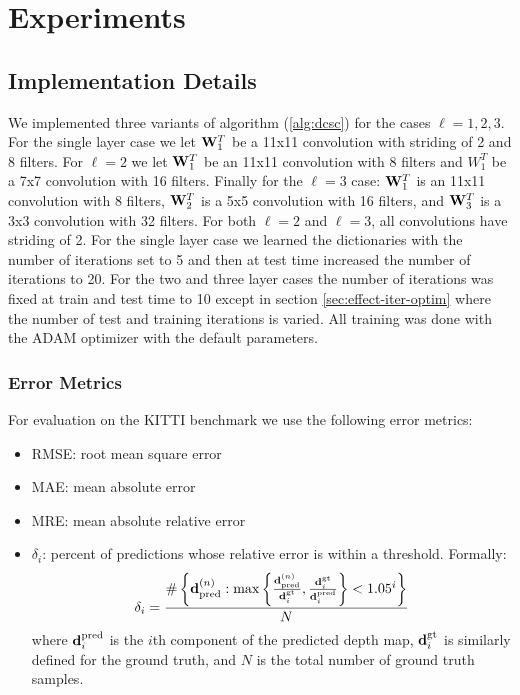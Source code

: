 \section{Experiments}

\subsection{Implementation Details}
\label{sec:impl-deta}

We implemented three variants of algorithm (\ref{alg:dcsc}) for the cases $\ell = 1,2,3$. For the single layer case we let $\mathbf{W}^T_1$ be a 11x11 convolution with striding of 2 and 8 filters. For $\ell = 2$ we let $\mathbf{W}^T_{1}$ be an 11x11 convolution with 8 filters and $W^T_{1}$ be a 7x7 convolution with 16 filters. Finally for the $\ell = 3$ case: $\mathbf{W}^T_{1}$ is an 11x11 convolution with 8 filters, $\mathbf{W}^T_{2}$ is a 5x5 convolution with 16 filters, and $\mathbf{W}^T_{3}$ is a 3x3 convolution with 32 filters. For both $\ell = 2$ and $\ell = 3$, all convolutions have striding of 2. For the single layer case we learned the dictionaries with the number of iterations set to 5 and then at test time increased the number of iterations to 20. For the two and three layer cases the number of iterations was fixed at train and test time to 10 except in section \ref{sec:effect-iter-optim} where the number of test and training iterations is varied. All training was done with the ADAM optimizer with the default parameters.

\subsubsection{Error Metrics}
\label{sec:error-metrics}

For evaluation on the KITTI benchmark we use the following error metrics:
\begin{itemize}
\item RMSE: root mean square error
\item MAE: mean absolute error
\item MRE: mean absolute relative error
\item $\delta_i$: percent of predictions whose relative error is within a threshold. Formally:
  \begin{equation*}
    \delta_i = \frac{\#\left\{\mathbf{d}^{(n)}_\text{pred} : \max\left\{\frac{\mathbf{d}^{(n)}_\text{pred}}{\mathbf{d}^\text{gt}_i}, \frac{\mathbf{d}^\text{gt}_i}{\mathbf{d}^\text{pred}_i}\right\} < 1.05^i\right\}}{N}
  \end{equation*}
  where $\mathbf{d}^\text{pred}_i$ is the $i$th component of the predicted depth map, $\mathbf{d}^\text{gt}_i$ is similarly defined for the ground truth, and $N$ is the total number of ground truth samples.
\end{itemize}
